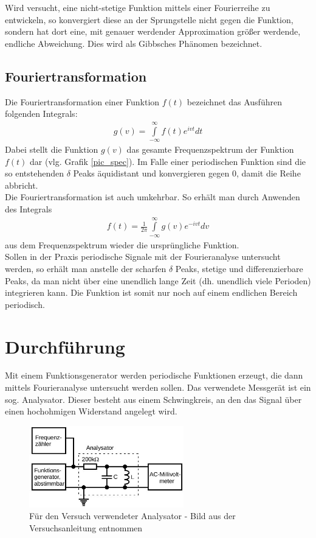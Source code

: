 Wird versucht, eine nicht-stetige Funktion mittels einer Fourierreihe zu entwickeln, so konvergiert diese an der Sprungstelle nicht gegen die Funktion, sondern hat dort eine, mit genauer werdender Approximation größer werdende, endliche Abweichung. Dies wird als Gibbsches Phänomen bezeichnet.

\subsection{Fouriertransformation}
Die Fouriertransformation einer Funktion $f(t)$ bezeichnet das Ausführen folgenden Integrals:
\begin{align}
g(v) = \int \limits _{-\infty}^\infty f(t) e^{ivt} dt
\label{eq_ftrafo}
\end{align}
Dabei stellt die Funktion $g(v)$ das gesamte Frequenzspektrum der Funktion $f(t)$ dar (vlg. Grafik \ref{pic_spec}). Im Falle einer periodischen Funktion sind die so entstehenden $\delta$ Peaks äquidistant und konvergieren gegen 0, damit die Reihe abbricht.\\

Die Fouriertransformation ist auch umkehrbar. So erhält man durch Anwenden des Integrals
\begin{align}
f(t) = \frac{1}{2\pi} \int \limits ^\infty _{-\infty} g(v) e^{-ivt} dv
\label{eq-ruecktrafo}
\end{align}
aus dem Frequenzspektrum wieder die ursprüngliche Funktion.\\

Sollen in der Praxis periodische Signale mit der Fourieranalyse untersucht werden, so erhält man anstelle der scharfen $\delta$ Peaks, stetige und differenzierbare Peaks, da man nicht über eine unendlich lange Zeit (dh. unendlich viele Perioden) integrieren kann. Die Funktion ist somit nur noch auf einem endlichen Bereich periodisch. 

\section{Durchführung}
Mit einem Funktionsgenerator werden periodische Funktionen erzeugt, die dann mittels Fourieranalyse untersucht werden sollen. Das verwendete Messgerät ist ein sog. Analysator. Dieser besteht aus einem Schwingkreis, an den das Signal über einen hochohmigen Widerstand angelegt wird. 
\begin{figure}[htbp]
\includegraphics[width=0.6\textwidth]{pics/analysator.jpeg}
\caption{Für den Versuch verwendeter Analysator - Bild aus der Versuchsanleitung entnommen}
\end{figure}

